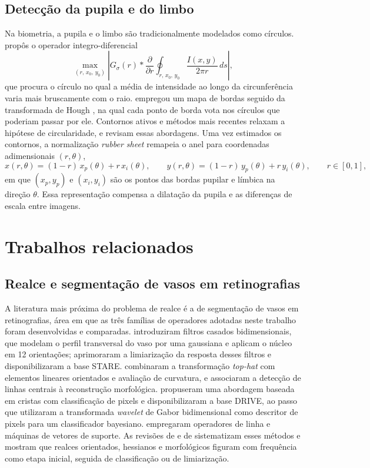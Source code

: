 \documentclass[12pt, oneside, a4paper, chapter=TITLE, section=TITLE,
               english, brazil]{abntex2}
\newcommand{\secao}[1]{\section[\texorpdfstring{\protect\MakeTextUppercase{#1}}{#1}]{#1}}
\newcommand{\tht}{\emph{top-hat}}
\begin{document}
\secao{Detecção da pupila e do limbo}

Na biometria, a pupila e o limbo são tradicionalmente modelados como
círculos. \citet{Daugman1993,Daugman2004} propôs o operador
integro-diferencial
\begin{equation}
  \max_{(r,\,x_0,\,y_0)}
  \left| G_\sigma(r) * \frac{\partial}{\partial r}
  \oint_{r,\,x_0,\,y_0} \frac{I(x,y)}{2\pi r}\, ds \right|,
\end{equation}
que procura o círculo no qual a média de intensidade ao longo da
circunferência varia mais bruscamente com o raio. \citet{Wildes1997} empregou
um mapa de bordas seguido da transformada de Hough \citep*{DudaHart1972}, na
qual cada ponto de borda vota nos círculos que poderiam passar por ele.
Contornos ativos \citep*{Kass1988} e métodos mais recentes relaxam a hipótese
de circularidade, e \citet{Bowyer2008} revisam essas abordagens. Uma vez
estimados os contornos, a normalização \emph{rubber sheet}
\citep*{Daugman2004} remapeia o anel para coordenadas adimensionais
$(r, \theta)$,
\begin{equation}
  x(r,\theta) = (1-r)\,x_p(\theta) + r\,x_i(\theta),
  \qquad
  y(r,\theta) = (1-r)\,y_p(\theta) + r\,y_i(\theta),
  \qquad r \in [0, 1],
  \label{eq:rubber}
\end{equation}
em que $(x_p, y_p)$ e $(x_i, y_i)$ são os pontos das bordas pupilar e
límbica na direção $\theta$. Essa representação compensa a dilatação da
pupila e as diferenças de escala entre imagens.

\chapter{Trabalhos relacionados}
\label{cap:relacionados}

\secao{Realce e segmentação de vasos em retinografias}

A literatura mais próxima do problema de realce é a de segmentação de vasos
em retinografias, área em que as três famílias de operadores adotadas neste
trabalho foram desenvolvidas e comparadas. \citet{Chaudhuri1989} introduziram
filtros casados bidimensionais, que modelam o perfil transversal do vaso por
uma gaussiana e aplicam o núcleo em 12 orientações; \citet{Hoover2000}
aprimoraram a limiarização da resposta desses filtros e disponibilizaram a
base STARE. \citet{ZanaKlein2001} combinaram a transformação \tht{} com
elementos lineares orientados e avaliação de curvatura, e
\citet{Mendonca2006} associaram a detecção de linhas centrais à reconstrução
morfológica. \citet{Staal2004} propuseram uma abordagem baseada em cristas com
classificação de pixels e disponibilizaram a base DRIVE, ao passo que
\citet{Soares2006} utilizaram a transformada \emph{wavelet} de Gabor
bidimensional como descritor de pixels para um classificador bayesiano.
\citet{RicciPerfetti2007} empregaram operadores de linha e máquinas de vetores
de suporte. As revisões de \citet{Abramoff2010} e de \citet{Fraz2012}
sistematizam esses métodos e mostram que realces orientados, hessianos e
morfológicos figuram com frequência como etapa inicial, seguida de
classificação ou de limiarização.
\end{document}
